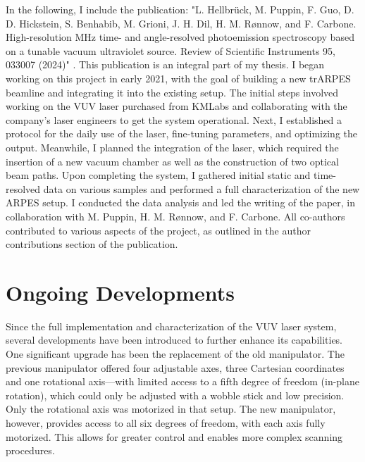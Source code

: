 In the following, I include the publication: "L. Hellbr\"uck, M. Puppin, F. Guo, D. D. Hickstein, S. Benhabib, M. Grioni, J. H. Dil, H. M. R{\o}nnow, and F. Carbone. High-resolution MHz time- and angle-resolved photoemission spectroscopy based on a tunable vacuum ultraviolet source. Review of Scientific Instruments 95, 033007 (2024)" \cite{hellbruck_high-resolution_2024}.
This publication is an integral part of my thesis.
I began working on this project in early 2021, with the goal of building a new trARPES beamline and integrating it into the existing setup.
The initial steps involved working on the VUV laser purchased from KMLabs and collaborating with the company's laser engineers to get the system operational.
Next, I established a protocol for the daily use of the laser, fine-tuning parameters, and optimizing the output.
Meanwhile, I planned the integration of the laser, which required the insertion of a new vacuum chamber as well as the construction of two optical beam paths.
Upon completing the system, I gathered initial static and time-resolved data on various samples and performed a full characterization of the new ARPES setup.
I conducted the data analysis and led the writing of the paper, in collaboration with M. Puppin, H. M. R{\o}nnow, and F. Carbone.
All co-authors contributed to various aspects of the project, as outlined in the author contributions section of the publication.



\section{Ongoing Developments}

Since the full implementation and characterization of the VUV laser system, several developments have been introduced to further enhance its capabilities.
One significant upgrade has been the replacement of the old manipulator.
The previous manipulator offered four adjustable axes, three Cartesian coordinates and one rotational axis—with limited access to a fifth degree of freedom (in-plane rotation), which could only be adjusted with a wobble stick and low precision.
Only the rotational axis was motorized in that setup.
The new manipulator, however, provides access to all six degrees of freedom, with each axis fully motorized.
This allows for greater control and enables more complex scanning procedures.

